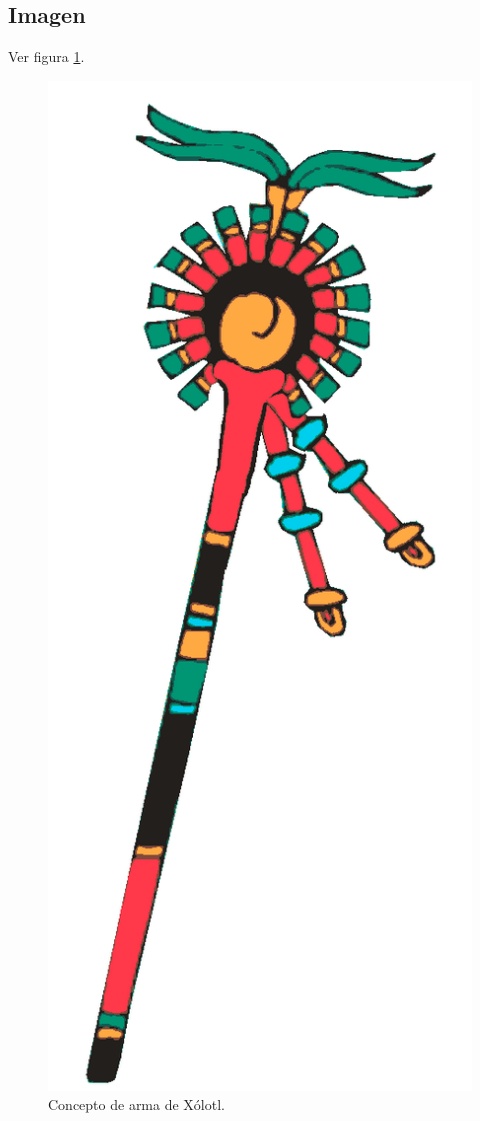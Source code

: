 	\subsection{Imagen}
		Ver figura \ref{fig:AtardecerVenus}.
		\begin{figure}
			\centering
			\includegraphics[height=0.3 \textheight]{Imagenes/baculo}
			\caption{Concepto de arma de Xólotl.}
			\label{fig:AtardecerVenus}
		\end{figure}
